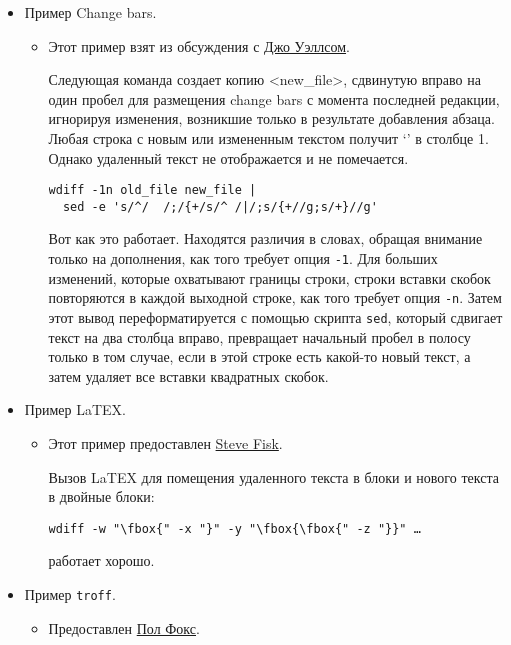 \begin{itemize}
\item
  Пример Change bars.

  \begin{itemize}
  \item
    Этот пример взят из обсуждения с \href{mailto:jbw@cs.bu.edu}{Джо
    Уэллсом}.

    Следующая команда создает копию \textless new\_file\textgreater,
    сдвинутую вправо на один пробел для размещения change bars с момента
    последней редакции, игнорируя изменения, возникшие только в
    результате добавления абзаца. Любая строка с новым или измененным
    текстом получит `\texttt{\textbar{}}' в столбце 1. Однако удаленный
    текст не отображается и не помечается.

\begin{verbatim}
wdiff -1n old_file new_file |
  sed -e 's/^/  /;/{+/s/^ /|/;s/{+//g;s/+}//g'
\end{verbatim}

    Вот как это работает. Находятся различия в словах, обращая внимание
    только на дополнения, как того требует опция \texttt{-1}. Для
    больших изменений, которые охватывают границы строки, строки вставки
    скобок повторяются в каждой выходной строке, как того требует опция
    \texttt{-n}. Затем этот вывод переформатируется с помощью скрипта
    \texttt{sed}, который сдвигает текст на два столбца вправо,
    превращает начальный пробел в полосу только в том случае, если в
    этой строке есть какой-то новый текст, а затем удаляет все вставки
    квадратных скобок.
  \end{itemize}
\item
  Пример LaTEX.

  \begin{itemize}
  \item
    Этот пример предоставлен \href{mailto:fisk@polar.bowdoin.edu}{Steve
    Fisk}.

    Вызов LaTEX для помещения удаленного текста в блоки и нового текста
    в двойные блоки:

\begin{verbatim}
wdiff -w "\fbox{" -x "}" -y "\fbox{\fbox{" -z "}}" …
\end{verbatim}

    работает хорошо.
  \end{itemize}
\item
  Пример \texttt{troff}.

  \begin{itemize}
  \item
    Предоставлен \href{mailto:pgf@cayman.com}{Пол Фокс}.


\end{itemize}
\end{itemize}
